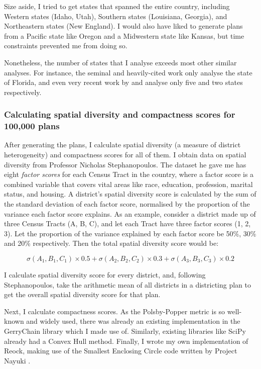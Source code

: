 \documentclass[]{article}
\begin{document}
Size aside, I tried to get states that spanned the entire country,
including Western states (Idaho, Utah), Southern states (Louisiana,
Georgia), and Northeastern states (New England). I would also have liked
to generate plans from a Pacific state like Oregon and a Midwestern
state like Kansas, but time constraints prevented me from doing so.

Nonetheless, the number of states that I analyse exceeds most other
similar analyses. For instance, the seminal and heavily-cited work
\cite{cr2013} only analyse the state of Florida, and even very recent
work by \cite{ddj2019recom} and \cite{s2020} analyse only five and two
states respectively.

\hypertarget{calculating-spatial-diversity-and-compactness-scores-for-100000-plans}{%
\subsubsection{Calculating spatial diversity and compactness scores for
100,000
plans}\label{calculating-spatial-diversity-and-compactness-scores-for-100000-plans}}

After generating the plans, I calculate spatial diversity (a measure of
district heterogeneity) and compactness scores for all of them. I obtain
data on spatial diversity from Professor Nicholas Stephanopoulos. The
dataset he gave me has eight \emph{factor scores} for each Census Tract
in the country, where a factor score is a combined variable that covers
vital areas like race, education, profession, marital status, and
housing. A district's spatial diversity score is calculated by the sum
of the standard deviation of each factor score, normalised by the
proportion of the variance each factor score explains. As an example,
consider a district made up of three Census Tracts (A, B, C), and let
each Tract have three factor scores (1, 2, 3). Let the proportion of the
variance explained by each factor score be 50\%, 30\% and 20\%
respectively. Then the total spatial diversity score would be:

\[ \sigma(A_1, B_1, C_1) \times 0.5 + \sigma(A_2, B_2, C_2) \times 0.3 + \sigma(A_3,
B_3, C_3) \times 0.2\]

I calculate spatial diversity score for every district, and, following
Stephanopoulos, take the arithmetic mean of all districts in a
districting plan to get the overall spatial diversity score for that
plan.

Next, I calculate compactness scores. As the Polsby-Popper metric is so
well-known and widely used, there was already an existing implementation
in the GerryChain library which I made use of. Similarly, existing
libraries like SciPy already had a Convex Hull method. Finally, I wrote
my own implementation of Reock, making use of the Smallest Enclosing
Circle code written by Project Nayuki \citep{nayuki2020}.
\end{document}
